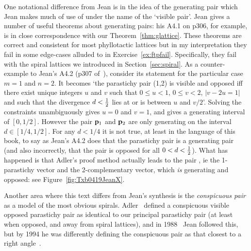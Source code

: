 One notational difference from Jean is in the idea of the generating pair which Jean makes much of use of under the name of the `visible pair'. Jean gives a number of useful theorems about generating pairs: his A4.1 on p306, for example,  is in close correspondence with our Theorem~\ref{thm:glattice}. These theorems are correct and consistent for most phyllotactic lattices but in my interpretation they fail in some edge-cases  alluded to in Exercise~\ref{ex:ftpfail}. Specifically, they fail with the spiral lattices we introduced in Section~\ref{sec:spiral}.
%
As a counter-example to Jean's A4.2 (p307 of~\cite{jeanPhyllotaxisSystemicStudy1994}), consider its statement for the particular case  $m=1$ and $n=2$. It becomes `the parastichy pair (1,2) is visible and opposed iff there exist unique integers $u$ and $v$ such that $0\leq u<1$, $0\leq v<2$, $|v-2u=1|$ and such that the divergence $d<\textstyle{\frac{1}{2}}$ lies at or is between $u$ and $v/2$'. Solving the constraints unambiguously gives $u=0$ and $v=1$, and gives a generating interval of $[0,1/2]$.  However the pair ${\mathbf p}_{1}$ and ${\mathbf p}_{2}$ are only generating on the interval $d\in [1/4,1/2]$. 
For any $d<1/4$ it is not true, at least in the language of this book, to say as  
Jean's A4.2 does that the parastichy pair   is a generating pair (and also incorrectly, that the pair is opposed for all $0<d<\textstyle{\frac{1}{2}}$).  What has happened is that Adler's proof method actually leads to the pair , ie the 1-parastichy vector and the 2-complementary vector, which \textit{is} generating and opposed: see Figure~\ref{fig:Txb0419JeanX}.




Another area where this text differs from Jean's synthesis is the \emph{conspicuous pair} as a model of the most obvious spirals. Adler~\cite{adlerModelContactPressure1974} defined a conspicuous visible opposed parastichy pair as identical to our principal parastichy pair (at least when opposed, and away from spiral lattices), and in 1988~\cite[p214]{jeanNumbertheoreticPropertiesTwodimensional1988} Jean followed this, but by 1994 he was differently defining the conspicuous pair as that closest to a right angle~\cite[p18]{jeanPhyllotaxisSystemicStudy1994}.

